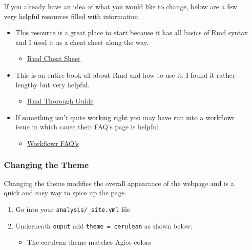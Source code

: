 \documentclass[openany]{book}
\providecommand{\tightlist}{%
  \setlength{\itemsep}{0pt}\setlength{\parskip}{0pt}}
\begin{document}
If you already have an idea of what you would like to change, below are a few very helpful resources filled with information:

\begin{itemize}
\tightlist
\item
  This resource is a great place to start because it has all basics of Rmd syntax and I used it as a cheat sheet along the way.

  \begin{itemize}
  \tightlist
  \item
    \href{https://rmarkdown.rstudio.com/authoring_basics.html}{Rmd Cheat Sheet}
  \end{itemize}
\item
  This is an entire book all about Rmd and how to use it. I found it rather lengthy but very helpful.

  \begin{itemize}
  \tightlist
  \item
    \href{https://bookdown.org/yihui/rmarkdown/html-document.html\#appearance_and_style}{Rmd Thorough Guide}
  \end{itemize}
\item
  If something isn't quite working right you may have run into a workflowr issue in which cause their FAQ's page is helpful.

  \begin{itemize}
  \tightlist
  \item
    \href{https://jdblischak.github.io/workflowr/articles/wflow-05-faq.html}{Workflowr FAQ's}
  \end{itemize}
\end{itemize}

\hypertarget{changing-the-theme}{%
\subsubsection{Changing the Theme}\label{changing-the-theme}}

Changing the theme modifies the overall appearance of the webpage and is a quick and easy way to spice up the page.

\begin{enumerate}
\def\labelenumi{\arabic{enumi}.}
\tightlist
\item
  Go into your \texttt{analysis/\_site.yml} file
\item
  Underneath \texttt{ouput} add \texttt{theme\ =\ cerulean} as shown below:

  \begin{itemize}
  \tightlist
  \item
    The cerulean theme matches Agios colors
  \end{itemize}
\end{enumerate}
\end{document}
